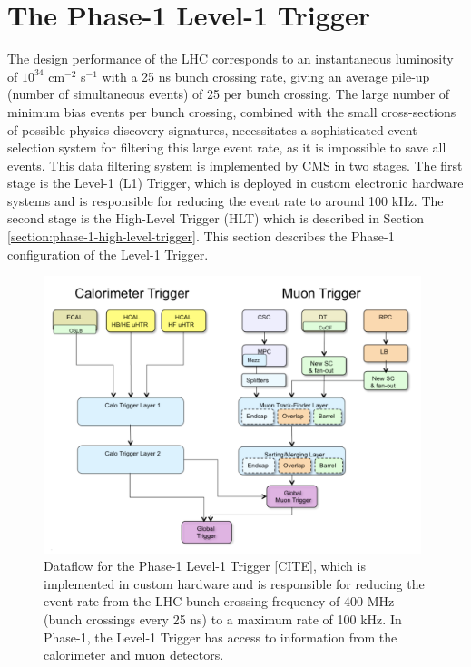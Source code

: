 
\section{The Phase-1 Level-1 Trigger}
\label{section:phase-1-l1-trigger}
The design performance of the LHC corresponds to an instantaneous luminosity of $10^{34}$ cm$^{-2}$ s$^{-1}$ with a 25 ns bunch crossing rate, giving an average pile-up (number of simultaneous events) of 25 per bunch crossing. The large number of minimum bias events per bunch crossing, combined with the small cross-sections of possible physics discovery signatures, necessitates a sophisticated event selection system for filtering this large event rate, as it is impossible to save all events. This data filtering system is implemented by CMS in two stages. The first stage is the Level-1 (L1) Trigger, which is deployed in custom electronic hardware systems and is responsible for reducing the event rate to around 100 kHz. The second stage is the High-Level Trigger (HLT) which is described in Section \ref{section:phase-1-high-level-trigger}. This section describes the Phase-1 configuration of the Level-1 Trigger.

\begin{figure}[ht]
    \centering
    \includegraphics[width=11cm]{figures/ch-3-phase1-l1-trigger/phase-1-level-1-trigger-dataflow.png}
    \caption{Dataflow for the Phase-1 Level-1 Trigger [CITE], which is implemented in custom hardware and is responsible for reducing the event rate from the LHC bunch crossing frequency of 400 MHz (bunch crossings every 25 ns) to a maximum rate of 100 kHz. In Phase-1, the Level-1 Trigger has access to information from the calorimeter and muon detectors.}
    \label{fig:phase-1-level-1-trigger-dataflow}
\end{figure}


